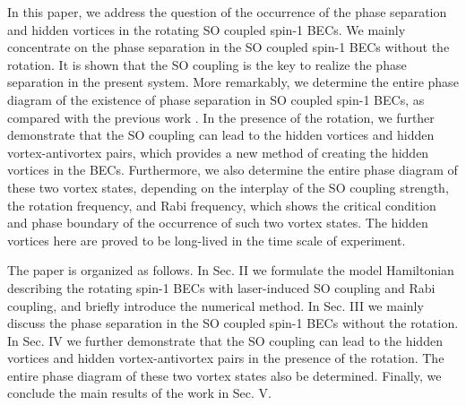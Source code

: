 \documentclass[aps,pra,showpacs,twocolumn,superscriptaddress]{revtex4-1}
\begin{document}
In this paper, we address the question of the occurrence of the phase separation and hidden vortices in the rotating SO coupled spin-1 BECs.
We mainly concentrate on the phase separation in the SO coupled spin-1 BECs without the rotation. It is shown that the SO coupling is the key to
realize the phase separation in the present system. More remarkably, we determine the entire phase diagram of the existence of
phase separation in SO coupled spin-1 BECs, as compared with the previous work \cite{Gautam2014}. In the presence of the rotation, we
further demonstrate that the SO coupling can lead to the hidden vortices and hidden vortex-antivortex pairs, which provides a new method
of creating the hidden vortices in the BECs. Furthermore, we also determine the entire phase diagram of these two vortex states, depending on the interplay of
the SO coupling strength, the rotation frequency, and Rabi frequency, which shows the critical condition and phase boundary of
the occurrence of such two vortex states. The hidden vortices here are
proved to be long-lived in the time scale of experiment.

The paper is organized as follows. In Sec. II we formulate
the model Hamiltonian describing the rotating spin-1 BECs with laser-induced SO
coupling and Rabi coupling, and briefly introduce the numerical method. In Sec. III we mainly
discuss the phase separation in the SO coupled spin-1 BECs without the rotation. In Sec. IV we further
demonstrate that the SO coupling can lead to the hidden vortices and hidden vortex-antivortex pairs
in the presence of the rotation. The entire phase diagram of these two vortex states also be determined. Finally, we
conclude the main results of the work in Sec. V.
\end{document}
